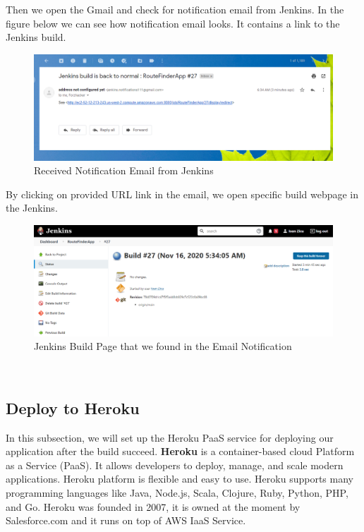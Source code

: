\documentclass[12pt,a4paper,twoside]{article}
\begin{document}
Then we open the Gmail and check for notification email from Jenkins. 
In the figure below we can see how notification email looks. It contains a link to the Jenkins build.


\begin{figure}[H]
    \centering
        \includegraphics[width=15cm]{images-aws/58-gmail-notification-received-full.png}
        \caption{Received Notification Email from Jenkins}
\end{figure}


By clicking on provided URL link in the email, we open specific build webpage in the Jenkins.


\begin{figure}[H]
    \centering
        \includegraphics[width=15cm]{images-aws/59-gmail-notification-link-open.png}
        \caption{Jenkins Build Page that we found in the Email Notification}
\end{figure}



~\newpage

\subsection{Deploy to Heroku}


In this subsection, we will set up the Heroku PaaS service for deploying our application after the build succeed. 
\textbf{Heroku} is a container-based cloud Platform as a Service (PaaS). It allows developers to deploy, manage, and scale modern applications. Heroku platform is flexible and easy to use. Heroku supports many programming languages like Java, Node.js, Scala, Clojure, Ruby, Python, PHP, and Go. Heroku was founded in 2007, it is owned at the moment by Salesforce.com and it runs on top of AWS IaaS Service.
\end{document}
